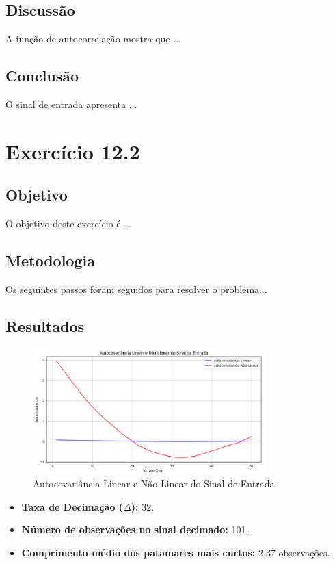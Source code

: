 \documentclass[12pt,a4paper]{article}
\begin{document}
\newpage

\subsection{Discussão}

A função de autocorrelação mostra que ...

\subsection{Conclusão}
O sinal de entrada apresenta ...


\section{Exercício 12.2}

\subsection{Objetivo}
O objetivo deste exercício é ...

\subsection{Metodologia}

Os seguintes passos foram seguidos para resolver o problema...

\subsection{Resultados}

\begin{figure}[h]
\centering
\includegraphics[width=0.8\textwidth]{12_2.png}
\caption{Autocovariância Linear e Não-Linear do Sinal de Entrada.}
\label{fig:autocovariance}
\end{figure}

\begin{itemize}
\item \textbf{Taxa de Decimação ($\Delta$):} 32.
\item \textbf{Número de observações no sinal decimado:} 101.
\item \textbf{Comprimento médio dos patamares mais curtos:} 2,37 observações.
\end{itemize}
\end{document}
